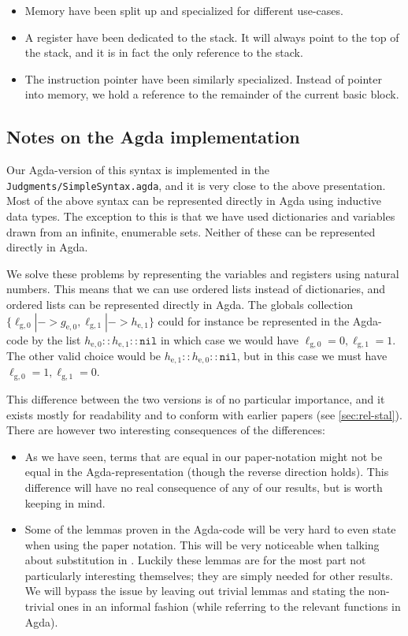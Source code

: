 \begin{itemize}
\item Memory have been split up and specialized for different use-cases.
\item A register have been dedicated to the stack. It will always point to the
  top of the stack, and it is in fact the only reference to the stack.
\item The instruction pointer have been similarly specialized. Instead of
  pointer into memory, we hold a reference to the remainder of the current basic
  block.
\end{itemize}

\subsection{Notes on the Agda implementation}

Our Agda-version of this syntax is implemented in the
\texttt{Judgments/SimpleSyntax.agda}, and it is very close to the above
presentation. Most of the above syntax can be represented directly in Agda using
inductive data types. The exception to this is that we have used dictionaries
and variables drawn from an infinite, enumerable sets. Neither of these can be
represented directly in Agda.

We solve these problems by representing the variables and registers using
natural numbers. This means that we can use ordered lists instead of
dictionaries, and ordered lists can be represented directly in Agda. The globals
collection
$\{\ell_{\mathrm{g},0} |-> g_{\mathrm{e},0}, \ell_{\mathrm{g},1} |->
h_{\mathrm{e},1}\}$ could for instance be represented in the Agda-code by the
list $h_{\mathrm{e},0} :: h_{\mathrm{e},1} :: \mathtt{nil}$ in which case we
would have $\ell_{\mathrm{g},0} = 0, \ell_{\mathrm{g},1} = 1$. The other valid
choice would be $h_{\mathrm{e},1} :: h_{\mathrm{e},0} :: \mathtt{nil}$, but in
this case we must have $\ell_{\mathrm{g},0} = 1, \ell_{\mathrm{g},1} = 0$.

This difference between the two versions is of no particular importance, and it
exists mostly for readability and to conform with earlier papers (see
\cref{sec:rel-stal}). There are however two interesting consequences of the
differences:

\begin{itemize}
\item As we have seen, terms that are equal in our paper-notation might not be
  equal in the Agda-representation (though the reverse direction holds). This
  difference will have no real consequence of any of our results, but is worth
  keeping in mind.
\item Some of the lemmas proven in the Agda-code will be very hard to even state
  when using the paper notation. This will be very noticeable when talking about
  substitution in \ATAL. Luckily these lemmas are for the most part not
  particularly interesting themselves; they are simply needed for other
  results. We will bypass the issue by leaving out trivial lemmas and stating
  the non-trivial ones in an informal fashion (while referring to the relevant
  functions in Agda).
\end{itemize}

